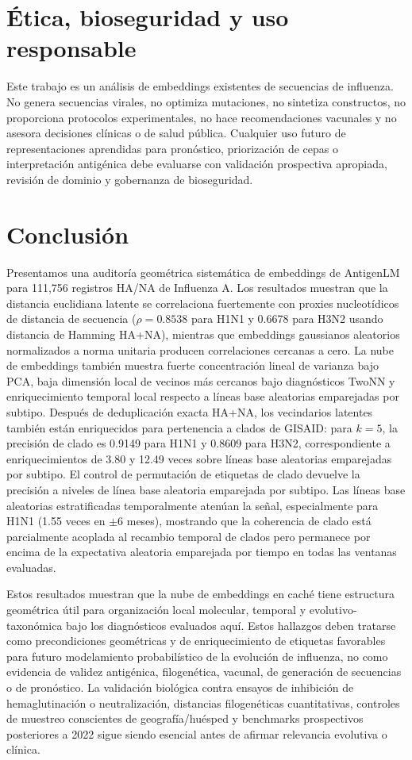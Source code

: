 \documentclass[11pt]{article}
\begin{document}
\section{Ética, bioseguridad y uso responsable}

Este trabajo es un análisis de embeddings existentes de secuencias de influenza. No genera secuencias virales, no optimiza mutaciones, no sintetiza constructos, no proporciona protocolos experimentales, no hace recomendaciones vacunales y no asesora decisiones clínicas o de salud pública. Cualquier uso futuro de representaciones aprendidas para pronóstico, priorización de cepas o interpretación antigénica debe evaluarse con validación prospectiva apropiada, revisión de dominio y gobernanza de bioseguridad.

\section{Conclusión}

Presentamos una auditoría geométrica sistemática de embeddings de AntigenLM para 111,756 registros HA/NA de Influenza A. Los resultados muestran que la distancia euclidiana latente se correlaciona fuertemente con proxies nucleotídicos de distancia de secuencia ($\rho=0.8538$ para H1N1 y 0.6678 para H3N2 usando distancia de Hamming HA+NA), mientras que embeddings gaussianos aleatorios normalizados a norma unitaria producen correlaciones cercanas a cero. La nube de embeddings también muestra fuerte concentración lineal de varianza bajo PCA, baja dimensión local de vecinos más cercanos bajo diagnósticos TwoNN y enriquecimiento temporal local respecto a líneas base aleatorias emparejadas por subtipo. Después de deduplicación exacta HA+NA, los vecindarios latentes también están enriquecidos para pertenencia a clados de GISAID: para $k=5$, la precisión de clado es 0.9149 para H1N1 y 0.8609 para H3N2, correspondiente a enriquecimientos de 3.80 y 12.49 veces sobre líneas base aleatorias emparejadas por subtipo. El control de permutación de etiquetas de clado devuelve la precisión a niveles de línea base aleatoria emparejada por subtipo. Las líneas base aleatorias estratificadas temporalmente atenúan la señal, especialmente para H1N1 (1.55 veces en $\pm 6$ meses), mostrando que la coherencia de clado está parcialmente acoplada al recambio temporal de clados pero permanece por encima de la expectativa aleatoria emparejada por tiempo en todas las ventanas evaluadas.

Estos resultados muestran que la nube de embeddings en caché tiene estructura geométrica útil para organización local molecular, temporal y evolutivo-taxonómica bajo los diagnósticos evaluados aquí. Estos hallazgos deben tratarse como precondiciones geométricas y de enriquecimiento de etiquetas favorables para futuro modelamiento probabilístico de la evolución de influenza, no como evidencia de validez antigénica, filogenética, vacunal, de generación de secuencias o de pronóstico. La validación biológica contra ensayos de inhibición de hemaglutinación o neutralización, distancias filogenéticas cuantitativas, controles de muestreo conscientes de geografía/huésped y benchmarks prospectivos posteriores a 2022 sigue siendo esencial antes de afirmar relevancia evolutiva o clínica.
\end{document}
